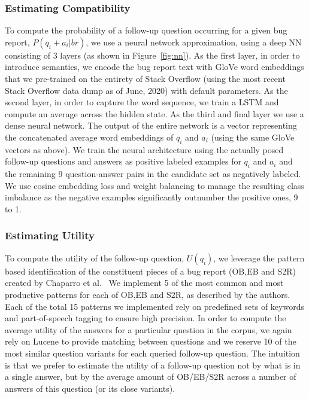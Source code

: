 \subsubsection{Estimating Compatibility}
To compute the probability of a follow-up question occurring for a given bug report, $P(q_{i}+a_{i}|br)$, we use a neural
network approximation, using a deep NN consisting of 3 layers (as shown in Figure~\ref{fig:nn}). As the first layer,
in order to introduce semantics, we encode the bug report text with GloVe word embeddings that we pre-trained on the entirety of Stack Overflow (using the most recent Stack Overflow data dump as of June, 2020) with default parameters. As the second layer, in order to capture the word sequence, we train a LSTM and compute an average across the hidden state. As the third and final layer we use a dense neural network. The output of the entire network is a vector representing the concatenated average word embeddings of $q_{i}$ and $a_{i}$ (using the same GloVe vectors as above). We train the neural architecture using the actually posed follow-up questions and answers as positive labeled examples for $q_{i}$ and $a_{i}$ and the remaining 9 question-answer pairs in the candidate set as negatively labeled. We use cosine embedding loss and weight balancing to manage the resulting class imbalance as the negative examples significantly outnumber the positive ones, 9 to 1.

\subsubsection{Estimating Utility}
To compute the utility of the follow-up question, $U(q_{i})$, we leverage the pattern based
identification of the constituent pieces of a bug report (OB,EB and S2R) created by Chaparro et al.~\cite{chaparro17detecting}
We implement 5 of the most common and most productive patterns for each of OB,EB and S2R, as described by
the authors. Each of the total 15 patterns we implemented rely on predefined sets of keywords and part-of-speech tagging to ensure high
precision. In order to compute the average utility of the answers for a particular question in the corpus, we again rely on Lucene to provide
matching between questions and we reserve 10 of the most similar question variants for each queried follow-up question. The intuition is that we prefer to estimate the utility of a follow-up question not by what is in a single answer, but by the average amount of OB/EB/S2R across a number of answers of this question (or its close variants).


%
%
%
